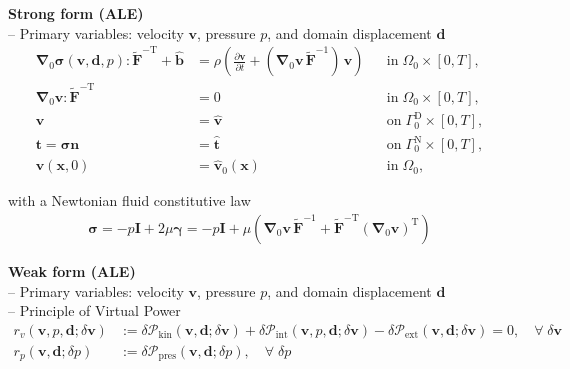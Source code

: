 \documentclass[a4paper,12pt]{report}
\newcommand{\bs}[1]{\boldsymbol{#1}}
\newcommand{\Om}{\mathit{\Omega}}
\newcommand{\Gm}{\mathit{\Gamma}}
\begin{document}
\textbf{Strong form (ALE)}\\

-- Primary variables: velocity $\bs{v}$, pressure $p$, and domain displacement $\bs{d}$
\begin{equation}
\label{equation-fluid-ale-strong-form}
\begin{aligned}
\bs{\nabla}_{0} \bs{\sigma}(\bs{v},\bs{d},p) : \widetilde{\bs{F}}^{-\mathrm{T}} + \hat{\bs{b}} &= \rho\left(\frac{\partial\bs{v}}{\partial t} + (\bs{\nabla}_0\bs{v}\,\widetilde{\bs{F}}^{-1})\,\bs{v}\right) &&\text{in} \; \mathit{\Om}_0 \times [0, T],\\
\bs{\nabla}_{0}\bs{v} : \widetilde{\bs{F}}^{-\mathrm{T}} &= 0 &&\text{in} \; \mathit{\Om}_0 \times [0, T],\\
\bs{v} &= \hat{\bs{v}} &&\text{on} \; \mathit{\Gm}_0^{\mathrm{D}} \times [0, T], \\
\bs{t} = \bs{\sigma}\bs{n} &= \hat{\bs{t}} &&\text{on} \; \mathit{\Gm}_0^{\mathrm{N}} \times [0, T], \\
\bs{v}(\bs{x},0) &= \hat{\bs{v}}_{0}(\bs{x}) &&\text{in} \; \mathit{\Om}_0,
\end{aligned}
\end{equation}

with a Newtonian fluid constitutive law
\begin{align}
\bs{\sigma} = -p \bs{I} + 2 \mu \bs{\gamma} = -p \bs{I} + \mu \left(\bs{\nabla}_0 \bs{v}\,\widetilde{\bs{F}}^{-1} + \widetilde{\bs{F}}^{-\mathrm{T}}(\bs{\nabla}_0 \bs{v})^{\mathrm{T}}\right)
\end{align}

\textbf{Weak form (ALE)}\\

-- Primary variables: velocity $\bs{v}$, pressure $p$, and domain displacement $\bs{d}$\\

-- Principle of Virtual Power
\begin{equation}
\label{equation-fluid-ale-weak-form}
\begin{aligned}
r_v(\bs{v},p,\bs{d};\delta\bs{v}) &:= \delta \mathcal{P}_{\mathrm{kin}}(\bs{v},\bs{d};\delta\bs{v}) + \delta \mathcal{P}_{\mathrm{int}}(\bs{v},p,\bs{d};\delta\bs{v}) - \delta \mathcal{P}_{\mathrm{ext}}(\bs{v},\bs{d};\delta\bs{v}) = 0, \quad \forall \; \delta\bs{v} \\
r_p(\bs{v},\bs{d};\delta p) &:= \delta \mathcal{P}_{\mathrm{pres}}(\bs{v},\bs{d};\delta p), \quad \forall \; \delta p
\end{aligned}
\end{equation}
\end{document}
